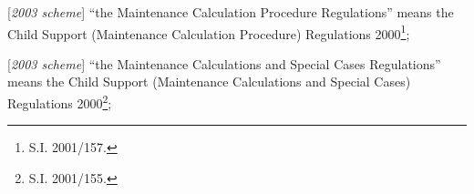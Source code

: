 \documentclass[12pt,a4paper]{article}
\begin{document}
\begin{enumerate}
 “the Maintenance Calculation Procedure Regulations” means the Child Support (Maintenance Calculation Procedure) Regulations 2000\footnote{\frenchspacing S.I. 2001/157.};

[\emph{2003 scheme}] “the Maintenance Calculations and Special Cases Regulations” means the Child Support (Maintenance Calculations and Special Cases) Regulations 2000\footnote{\frenchspacing S.I. 2001/155.};


%


%
%


\end{enumerate}
\end{document}
